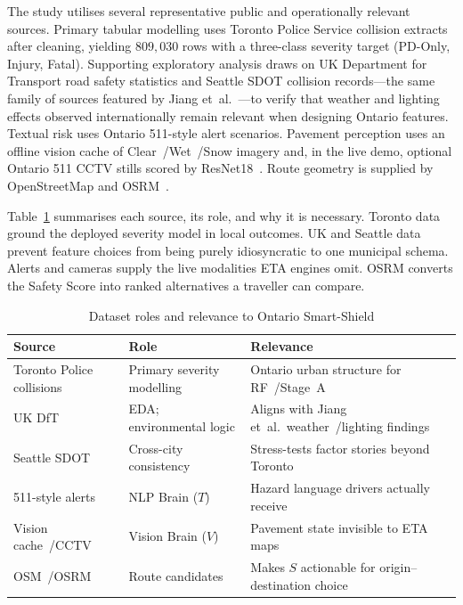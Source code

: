 \documentclass[11pt,a4paper]{article}
\begin{document}
The study utilises several representative public and operationally relevant sources. Primary tabular modelling uses Toronto Police Service collision extracts after cleaning, yielding $809{,}030$ rows with a three-class severity target (PD-Only, Injury, Fatal). Supporting exploratory analysis draws on UK Department for Transport road safety statistics and Seattle SDOT collision records---the same family of sources featured by Jiang et~al.~\citep{jiang2024traffic}---to verify that weather and lighting effects observed internationally remain relevant when designing Ontario features. Textual risk uses Ontario 511-style alert scenarios. Pavement perception uses an offline vision cache of Clear~/Wet~/Snow imagery and, in the live demo, optional Ontario 511 CCTV stills scored by ResNet18~\citep{he2016resnet,itss_road}. Route geometry is supplied by OpenStreetMap and OSRM~\citep{openstreetmap,osrm}.

Table~\ref{tab:datasets} summarises each source, its role, and why it is necessary. Toronto data ground the deployed severity model in local outcomes. UK and Seattle data prevent feature choices from being purely idiosyncratic to one municipal schema. Alerts and cameras supply the live modalities ETA engines omit. OSRM converts the Safety Score into ranked alternatives a traveller can compare.

\begin{table}[htbp]
\centering
\caption{Dataset roles and relevance to Ontario Smart-Shield}
\label{tab:datasets}
\small
\begin{tabular}{@{}p{3.0cm}p{3.6cm}p{6.2cm}@{}}
\toprule
\textbf{Source} & \textbf{Role} & \textbf{Relevance} \\
\midrule
Toronto Police collisions & Primary severity modelling & Ontario urban structure for RF~/Stage~A \\
UK DfT & EDA; environmental logic & Aligns with Jiang et~al.\ weather~/lighting findings \\
Seattle SDOT & Cross-city consistency & Stress-tests factor stories beyond Toronto \\
511-style alerts & NLP Brain ($T$) & Hazard language drivers actually receive \\
Vision cache~/CCTV & Vision Brain ($V$) & Pavement state invisible to ETA maps \\
OSM~/OSRM & Route candidates & Makes $S$ actionable for origin--destination choice \\
\bottomrule
\end{tabular}
\end{table}
\end{document}
